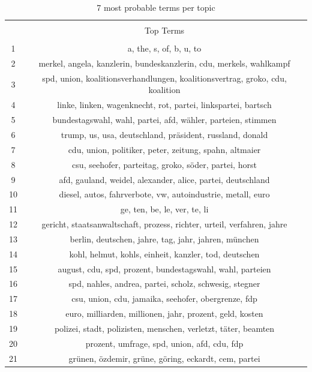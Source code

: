 \documentclass[
  12pt,
]{article}
\begin{document}
\begin{table}[!htbp] \centering 
  \caption{7 most probable terms per topic} 
  \label{table:top_terms} 
\begin{tabular}{@{\extracolsep{5pt}} cc} 
\\[-1.8ex]\hline 
\hline \\[-1.8ex] 
 & Top Terms \\ 
\hline \\[-1.8ex] 
1 & a, the, s, of, b, u, to \\ 
2 & merkel, angela, kanzlerin, bundeskanzlerin, cdu, merkels, wahlkampf \\ 
3 & spd, union, koalitionsverhandlungen, koalitionsvertrag, groko, cdu, koalition \\ 
4 & linke, linken, wagenknecht, rot, partei, linkspartei, bartsch \\ 
5 & bundestagswahl, wahl, partei, afd, wähler, parteien, stimmen \\ 
6 & trump, us, usa, deutschland, präsident, russland, donald \\ 
7 & cdu, union, politiker, peter, zeitung, spahn, altmaier \\ 
8 & csu, seehofer, parteitag, groko, söder, partei, horst \\ 
9 & afd, gauland, weidel, alexander, alice, partei, deutschland \\ 
10 & diesel, autos, fahrverbote, vw, autoindustrie, metall, euro \\ 
11 & ge, ten, be, le, ver, te, li \\ 
12 & gericht, staatsanwaltschaft, prozess, richter, urteil, verfahren, jahre \\ 
13 & berlin, deutschen, jahre, tag, jahr, jahren, münchen \\ 
14 & kohl, helmut, kohls, einheit, kanzler, tod, deutschen \\ 
15 & august, cdu, spd, prozent, bundestagswahl, wahl, parteien \\ 
16 & spd, nahles, andrea, partei, scholz, schwesig, stegner \\ 
17 & csu, union, cdu, jamaika, seehofer, obergrenze, fdp \\ 
18 & euro, milliarden, millionen, jahr, prozent, geld, kosten \\ 
19 & polizei, stadt, polizisten, menschen, verletzt, täter, beamten \\ 
20 & prozent, umfrage, spd, union, afd, cdu, fdp \\ 
21 & grünen, özdemir, grüne, göring, eckardt, cem, partei \\ 

\end{tabular}
\end{table}
\end{document}
